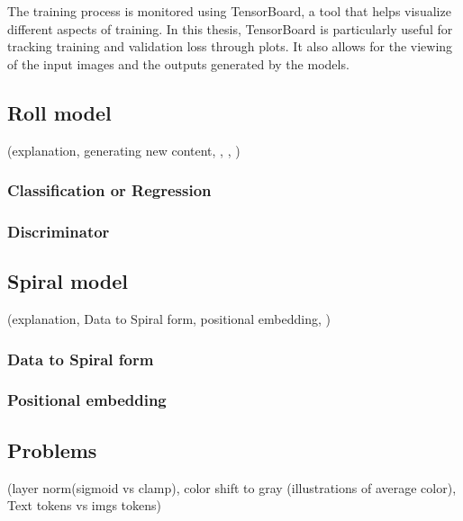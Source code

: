     The training process is monitored using TensorBoard, a tool that helps visualize different aspects of training. In this thesis, TensorBoard is particularly useful for tracking training and validation loss through plots. It also allows for the viewing of the input images and the outputs generated by the models.    
    

\subsection{Roll model}
    (explanation, generating new content, , , )    
    
    \subsubsection{Classification or Regression}
    \subsubsection{Discriminator}


\subsection{Spiral model}
    (explanation, Data to Spiral form, positional embedding, )

    \subsubsection{Data to Spiral form}



    \subsubsection{Positional embedding}

\subsection{Problems}
    (layer norm(sigmoid vs clamp), color shift to gray (illustrations of average color), Text tokens vs imgs tokens)